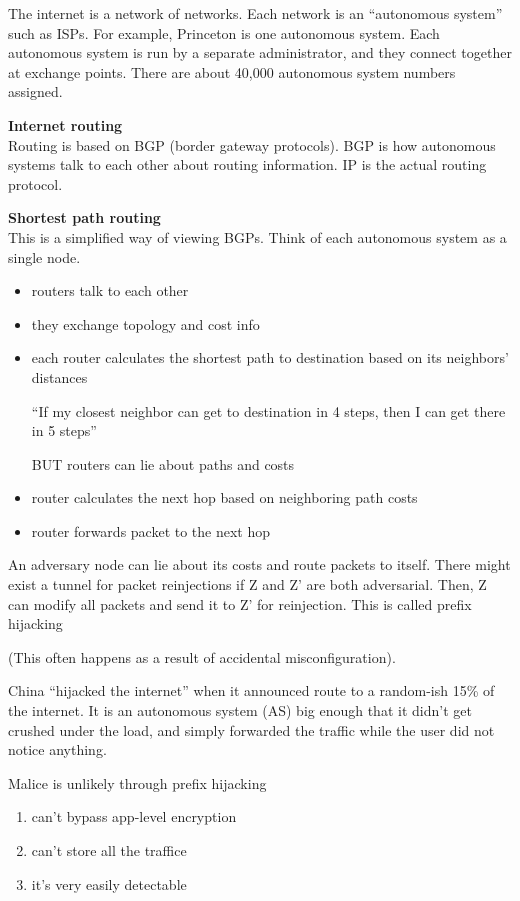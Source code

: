 The internet is a network of networks. Each network is an ``autonomous system'' such as ISPs. For example, Princeton is one autonomous system. Each autonomous system is run by a separate administrator, and they connect together at exchange points. There are about 40,000 autonomous system numbers assigned.

\textbf{Internet routing}\\
Routing is based on BGP (border gateway protocols). BGP is how autonomous systems talk to each other about routing information. IP is the actual routing protocol. 

\textbf{Shortest path routing}\\
This is a simplified way of viewing BGPs. Think of each autonomous system as a single node.
\begin{itemize}
	\item routers talk to each other
	\item they exchange topology and cost info
	\item each router calculates the shortest path to destination based on its neighbors' distances

		``If my closest neighbor can get to destination in 4 steps, then I can get there in 5 steps''

		BUT routers can lie about paths and costs
	\item router calculates the next hop based on neighboring path costs
	\item router forwards packet to the next hop
\end{itemize}

An adversary node can lie about its costs and route packets to itself. There might exist a tunnel for packet reinjections if Z and Z' are both adversarial. Then, Z can modify all packets and send it to Z' for reinjection. This is called prefix hijacking

(This often happens as a result of accidental misconfiguration). 

\begin{example}
China ``hijacked the internet'' when it announced route to a random-ish 15\% of the internet. It is an autonomous system (AS) big enough that it didn't get crushed under the load, and simply forwarded the traffic while the user did not notice anything.
\end{example}

Malice is unlikely through prefix hijacking
\begin{enumerate}
	\item can't bypass app-level encryption
	\item can't store all the traffice
	\item it's very easily detectable
\end{enumerate}

